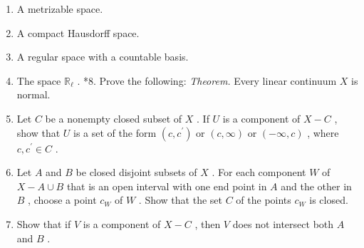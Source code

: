 \begin{enumerate}[itemsep=0.4em, parsep=0pt, topsep=0pt, partopsep=0pt, leftmargin=*, label=\arabic*., ref=\arabic*]
\begin{enumerate}[itemsep=0.2em, parsep=0pt, topsep=0pt, partopsep=0pt, leftmargin=*, label=(\alph*), align=left]
  \item A metrizable space.
  \item A compact Hausdorff space.
  \item A regular space with a countable basis.
  \item The space \({\mathbb{R}}_{\ell }\) . *8. Prove the following: \textsl{Theorem.} Every linear continuum \(X\) is normal.
  \item Let \(C\) be a nonempty closed subset of \(X\) . If \(U\) is a component of \(X - C\) , show that \(U\) is a set of the form \(\left( {c,{c}^{\prime }}\right)\) or \(\left( {c,\infty }\right)\) or \(\left( {-\infty ,c}\right)\) , where \(c,{c}^{\prime } \in  C\) .
  \item Let \(A\) and \(B\) be closed disjoint subsets of \(X\) . For each component \(W\) of \(X - A \cup  B\) that is an open interval with one end point in \(A\) and the other in \(B\) , choose a point \({c}_{W}\) of \(W\) . Show that the set \(C\) of the points \({c}_{W}\) is closed.
  \item Show that if \(V\) is a component of \(X - C\) , then \(V\) does not intersect both \(A\) and \(B\) .


\end{enumerate}
\end{enumerate}
